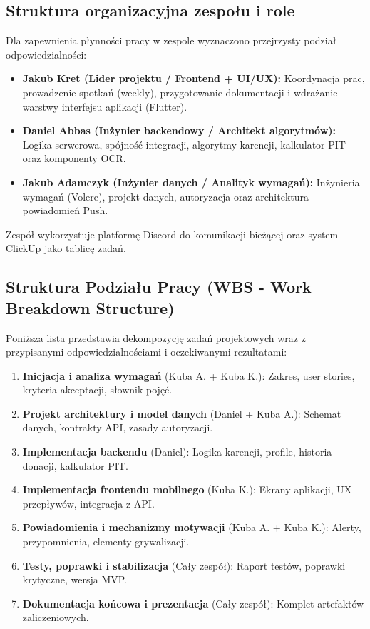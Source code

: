 \documentclass[11pt, a4paper]{article}
\begin{document}
\subsection{Struktura organizacyjna zespołu i role}

Dla zapewnienia płynności pracy w zespole wyznaczono przejrzysty podział odpowiedzialności:

\begin{itemize}
  \item \textbf{Jakub Kret (Lider projektu / Frontend + UI/UX):} Koordynacja prac, prowadzenie spotkań (weekly), przygotowanie dokumentacji i wdrażanie warstwy interfejsu aplikacji (Flutter).
  \item \textbf{Daniel Abbas (Inżynier backendowy / Architekt algorytmów):} Logika serwerowa, spójność integracji, algorytmy karencji, kalkulator PIT oraz komponenty OCR.
  \item \textbf{Jakub Adamczyk (Inżynier danych / Analityk wymagań):} Inżynieria wymagań (Volere), projekt danych, autoryzacja oraz architektura powiadomień Push.
\end{itemize}

Zespół wykorzystuje platformę Discord do komunikacji bieżącej oraz system ClickUp jako tablicę zadań.

\subsection{Struktura Podziału Pracy (WBS - Work Breakdown Structure)}

Poniższa lista przedstawia dekompozycję zadań projektowych wraz z przypisanymi odpowiedzialnościami i oczekiwanymi rezultatami:

\begin{enumerate}[label=\textbf{\arabic*.0}]
  \item \textbf{Inicjacja i analiza wymagań} (Kuba A. + Kuba K.): Zakres, user stories, kryteria akceptacji, słownik pojęć.
  \item \textbf{Projekt architektury i model danych} (Daniel + Kuba A.): Schemat danych, kontrakty API, zasady autoryzacji.
  \item \textbf{Implementacja backendu} (Daniel): Logika karencji, profile, historia donacji, kalkulator PIT.
  \item \textbf{Implementacja frontendu mobilnego} (Kuba K.): Ekrany aplikacji, UX przepływów, integracja z API.
  \item \textbf{Powiadomienia i mechanizmy motywacji} (Kuba A. + Kuba K.): Alerty, przypomnienia, elementy grywalizacji.
  \item \textbf{Testy, poprawki i stabilizacja} (Cały zespół): Raport testów, poprawki krytyczne, wersja MVP.
  \item \textbf{Dokumentacja końcowa i prezentacja} (Cały zespół): Komplet artefaktów zaliczeniowych.
\end{enumerate}
\end{document}
